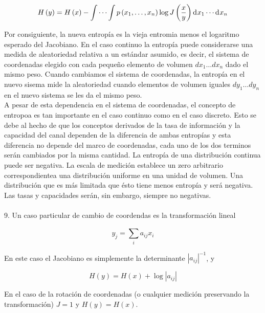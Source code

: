 \begin{equation}
H\left ( y \right )=H\left ( x \right )-\int \cdots \int p\left ( x_{1}, \ldots ,x_{n} \right )\log J \left ( \frac{x}{y} \right ) \diff x _{1}\cdots  \diff x _{n}
\end{equation}

Por consiguiente, la nueva entrop\'ia es la vieja entromia menos el logaritmo esperado del Jacobiano. En el caso continuo la entrop\'ia puede considerarse una medida de aleatoriedad relativa a un est\'andar asumido, es decir, el sistema de coordenadas elegido con cada peque\~no elemento de volumen $dx_{1}\dots dx_{n}$ dado el mismo peso. Cuando cambiamos el sistema de coordenadas, la entrop\'ia en el nuevo sisema mide la aleatoriedad cuando elementos de volumen iguales $dy_{1}\dots dy_{n}$ en el nuevo sistema se les da el mismo peso.
\\
A pesar de esta dependencia en el sistema de coordenadas, el concepto de entropoa es tan importante en el caso continuo como en el caso discreto. Esto se debe al hecho de que los conceptos derivados de la tasa de informaci\'on y la capacidad del canal dependen de la diferencia de ambas entrop\'ias y esta diferencia no depende del marco de coordenadas, cada uno de los dos terminos ser\'an cambiados por la misma cantidad.
La entrop\'ia de una distribuci\'on continua puede ser negativa. La escala de medici\'on establece un zero arbitrario correspondientea una distribuci\'on uniforme en una unidad de volumen. Una distribuci\'on que es m\'as limitada que \'esto tiene menos entrop\'ia y ser\'a negativa. Las tasas y capacidades ser\'an, sin embargo, siempre no negativas.
\\
\\
9. Un caso particular de cambio de coordendas es la transformaci\'on lineal

\begin{equation}
y_{j}=\sum_{i}^{\:}a_{ij}x_{i}
\end{equation}

En este caso el Jacobiano es simplemente la determinante $\left | a_{ij} \right |^{-1}$, y

\begin{equation}
H\left ( y \right )=H\left ( x \right )+\log\left | a_{ij} \right |
\end{equation}

En el caso de la rotaci\'on de coordenadas (o cualquier medici\'on preservando la transformaci\'on) $J=1$ y $H\left ( y \right ) = H\left ( x \right )$.\newline \newline

